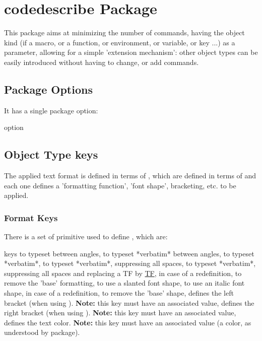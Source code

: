 \documentclass{article}
\begin{document}
\section{codedescribe Package}

This package aims at minimizing the number of commands, having the object kind (if a macro, or a function, or environment, or variable, or key ...) as a parameter, allowing for a simple 'extension mechanism': other object types can be easily introduced without having to change, or add commands.

\subsection{Package Options}
It has a single package option:

\begin{describelist}{option}
\end{describelist}

\subsection{Object Type keys}\label{obj-type-def}

The applied text format is defined in terms of , which are defined in terms of  and each one defines a 'formatting function', 'font shape', bracketing, etc. to be applied.

\subsubsection{Format Keys}\label{format-keys}
There is a set of primitive  used to define  , which are:

\begin{describelist*}{keys}
   { to typeset between angles,}
   { to typeset *verbatim* between angles,}
   { to typeset *verbatim*,}
   { to typeset *verbatim*, suppressing all spaces,}
   { to typeset *verbatim*, suppressing all spaces and replacing a TF by \underline{TF},}
   { in case of a redefinition, to remove the 'base' formatting,}
   { to use a slanted font shape,}
   { to use an italic font shape,}
   { in case of a redefinition, to remove the 'base' shape,}
    { defines the left bracket (when using \tsobj{\tsargs}). \textbf{Note:} this key must have an associated value,}
    { defines the right bracket (when using \tsobj{\tsargs}). \textbf{Note:} this key must have an associated value,}
     { defines the text color. \textbf{Note:} this key must have an associated value (a color, as understood by  package).}
\end{describelist*}
\end{document}
